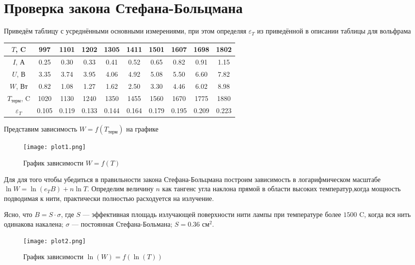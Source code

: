 \documentclass[12pt]{article}
\begin{document}
\section*{Проверка закона Стефана-Больцмана}
\par
	Приведём таблицу с усреднёнными основными измерениями, при этом определяя $\varepsilon_T$ из приведённой в описании таблицы для вольфрама
\begin{table}[h!]
	\centering
	\begin{tabular}{|c|c|c|c|c|c|c|c|c|c|}
	\hline
		$T$, \degree C & 997& 1101& 1202& 1305& 1411& 1501& 1607& 1698& 1802 \\
	\hline
		$I$, А & 0.25 & 0.30 & 0.33 & 0.41 & 0.52 & 0.65 & 0.82& 0.91 & 1.15 \\
	\hline
		$U$, В & 3.35 & 3.74 & 3.95 & 4.06 & 4.92 & 5.08 & 5.50 & 6.60 & 7.82 \\
	\hline
		$W$, Вт & 0.82 & 1.08 & 1.27 & 1.62 & 2.50 & 3.30 & 4.46 & 6.02 & 8.98 \\
	\hline
		$T_\text{терм}$, \degree C & 1020 & 1130 &  1240 & 1350 & 1455 & 1560 & 1670 & 1775 & 1880 \\
	\hline
		$\varepsilon_T$ & 0.105 & 0.119 & 0.133& 0.144 & 0.164 & 0.179 & 0.195 & 0.209 & 0.223 \\
	\hline
	\end{tabular}
\end{table}
\par
	Представим зависимость $W = f(T_\text{терм})$ на графике
\begin{figure}[h!]
	\centering
	\texttt{[image: plot1.png]}
	\caption{График зависимости $W = f(T)$}
\end{figure}
\par
	Для для того чтобы убедиться в правильности закона Стефана-Больцмана построим зависимость в логарифмическом масштабе $\ln W = \ln \left(e_T B\right) + n \ln T$. Определим величину $n$ как тангенс угла наклона прямой в области высоких температур,когда мощность подводимая к нити, практически полностью расходуется на излучение.
\par
	Ясно, что $B = S \cdot \sigma$, где $S$ --- эффективная площадь излучающей поверхности нити лампы при температуре более $1500$ \degree C, когда вся нить одинакова накалена; $\sigma$ --- постоянная Стефана-Больмана; $S = 0.36$ $\text{см}^2$.
\begin{figure}[h!]
	\centering
	\texttt{[image: plot2.png]}
	\caption{График зависимости $\ln(W) = f(\ln(T))$}	
\end{figure}
\end{document}
